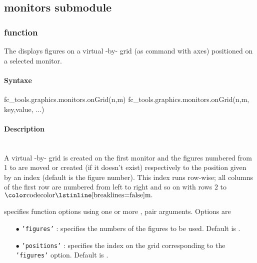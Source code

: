 \subsection{monitors submodule}
\subsubsection[fc\_tools.graphics.monitors.onGrid function]{ function}
The  displays figures on a virtual -by- grid 
(as  command with axes) positioned on a selected monitor. 
\paragraph{Syntaxe}
\begin{syntaxe}
fc_tools.graphics.monitors.onGrid(n,m)
fc_tools.graphics.monitors.onGrid(n,m, key,value, ...)
\end{syntaxe}

\paragraph{Description}
\begin{description}
\item {}\\
A virtual -by- grid is created on the first monitor and the figures numbered from 1 to 
are moved or created (if it doesn't exist) respectively to the position given by an index (default is the figure number).
This index runs row-wise; all columns of the first row are numbered from left to right and so on with rows $2$ to $\fcmcode{m}.$ 
%
\item {}
specifies function options using one or more , pair 
arguments. Options are
\begin{itemize}
\item[$\bullet$] \texttt{'figures'} : specifies the numbers of the figures to be used. 
Default is .
\item[$\bullet$] \texttt{'positions'} : specifies the index on the grid corresponding to the \texttt{'figures'} option.
Default is .
\end{itemize}
\end{description}

